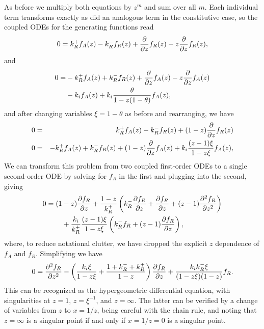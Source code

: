 As before we multiply both equations by $z^m$ and sum over all $m$. Each
individual term transforms exactly as did an analogous term in the constitutive
case, so the coupled ODEs for the generating functions read
\begin{equation}
0 = k_R^+ f_A(z) - k_R^- f_R(z) + \pderiv{z} f_R(z) - z \pderiv{z} f_R(z),
\end{equation}
and
\begin{equation}
\begin{split}
0 =&  - k_R^+ f_A(z) + k_R^- f_R(z) + \pderiv{z} f_A(z) - z \pderiv{z} f_A(z)
\\
&- k_i f_A(z) + k_i \frac{\theta}{1-z(1-\theta)} f_A(z),
\end{split}
\end{equation}
and after changing variables $\xi = 1 - \theta$ as before and rearranging, we
have
\begin{eqnarray}
0 &=& k_R^+ f_A(z) - k_R^- f_R(z) + (1-z) \pderiv{z} f_R(z)
\\
0 &=&  - k_R^+ f_A(z) + k_R^- f_R(z) + (1 - z) \pderiv{z} f_A(z)
+ k_i \frac{(z-1)\xi}{1-z\xi} f_A(z),
\end{eqnarray}
We can transform this problem from two coupled first-order ODEs to a single
second-order ODE by solving for $f_A$ in the first and plugging into the second,
giving
\begin{equation}
\begin{split}
0 = (1&-z) \pderiv[f_R]{z}
+ \frac{1-z}{k_R^+}
        \left(k_R^- \pderiv[f_R]{z} + \pderiv[f_R]{z} +(z-1) \psecderiv[f_R]{z}\right)
\\
&+ \frac{k_i}{k_R^+} \frac{(z-1)\xi}{1-z\xi}
        \left(k_R^- f_R + (z-1) \pderiv[f_R]{z}\right),
\end{split}
\end{equation}
where, to reduce notational clutter, we have dropped the explicit $z$ dependence
of $f_A$ and $f_R$. Simplifying we have
\begin{equation}
0 = \psecderiv[f_R]{z}
        - \left(\frac{k_i\xi}{1-z\xi}
                + \frac{1 + k_R^- + k_R^+}{1-z}
        \right)\pderiv[f_R]{z}
        + \frac{k_i k_R^- \xi}{(1-z\xi)(1-z)}f_R.
\end{equation}
This can be recognized as the hypergeometric differential equation, with
singularities at $z=1$, $z=\xi^{-1}$, and $z=\infty$. The latter can be verified
by a change of variables from $z$ to $x=1/z$, being careful with the chain rule,
and noting that $z=\infty$ is a singular point if and only if $x=1/z=0$ is a
singular point.

